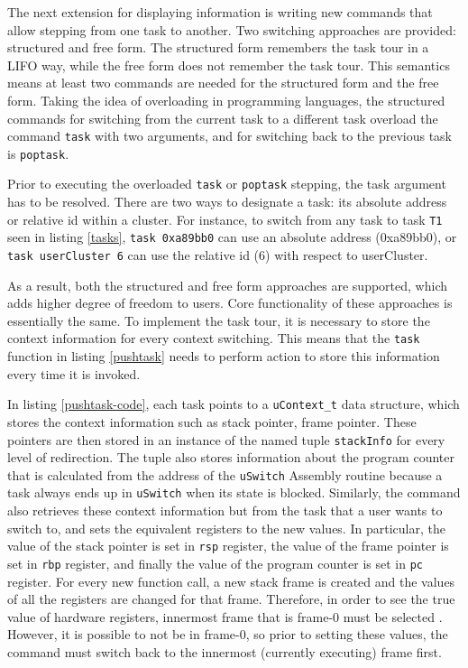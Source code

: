 The next extension for displaying information is writing new commands that allow
stepping from one \uCPPS task to another. Two switching approaches are
provided: structured and free form. The structured form remembers the task tour in a
LIFO way, while the free form does not remember the task tour. This semantics means
at least two commands are needed for the structured form and the free form.
Taking the idea of overloading in programming languages, the structured
commands for switching from the current task to a different task overload the
command \verb|task| with two  arguments, and
for switching back to the previous task is \verb|poptask|.

Prior to executing the overloaded \verb|task| or \verb|poptask| stepping, the
task argument has to be resolved. There are two ways to designate a task: its
absolute address or relative id within a cluster. For instance, to switch from
any task to task \verb|T1| seen in listing \ref{tasks}, \verb|task 0xa89bb0| can use an absolute address (0xa89bb0), or \verb|task userCluster 6| can use the relative id (6) with respect to userCluster.

As a result, both the structured and free form approaches are supported, which
adds higher degree of freedom to users. Core functionality of these approaches
is essentially the same. To implement the task tour, it is necessary
to store the context information for every context switching. This means that
the \verb|task| function in listing \ref{pushtask} needs to perform action to
store this information every time it is invoked.

In listing \ref{pushtask-code}, each task points to a \verb|uContext_t| data
structure, which stores the context
information such as stack pointer, frame pointer. These pointers are then
stored in an instance of the named tuple \verb|stackInfo| for every level of
redirection. The tuple also stores information about the program counter that
is calculated from the address of the \verb|uSwitch| Assembly routine because a task always ends up in \verb|uSwitch| when its state is blocked. Similarly, the command
also retrieves these context information but from the task that a user wants to switch to, and
sets the equivalent registers to the new values. In particular, the value of the stack
pointer is set in \verb|rsp| register, the value of the frame pointer is set in \verb|rbp|
register, and finally the value of the program counter is set in \verb|pc| register.
For every new function call, a new stack frame is created and the values of all
the registers are changed for that frame. Therefore, in
order to see the true value of hardware registers, innermost frame that is
frame-0 must be selected \cite{reference11}. However, it is possible to not be in frame-0, so prior to setting these values,
the command must switch back to the innermost (currently executing) frame first.

